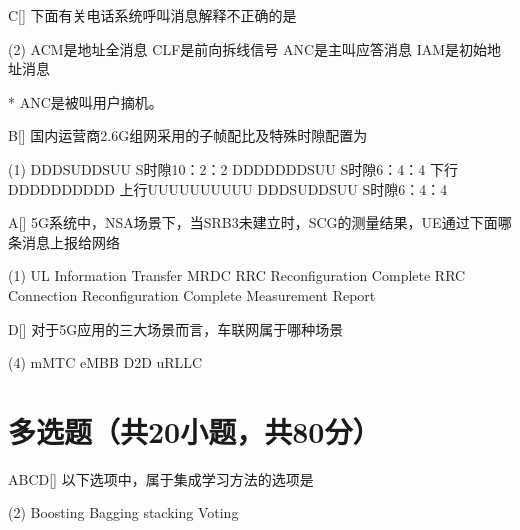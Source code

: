 \begin{choice}{C}[]
    下面有关电话系统呼叫消息解释不正确的是
    \begin{tasks}(2)
        \task ACM是地址全消息
        \task CLF是前向拆线信号
        \task ANC是主叫应答消息
        \task IAM是初始地址消息
    \end{tasks}
\end{choice}

\begin{solution}*
   ANC是被叫用户摘机。

\end{solution}

\begin{choice}{B}[]
    国内运营商2.6G组网采用的子帧配比及特殊时隙配置为
    \begin{tasks}(1)
        \task DDDSUDDSUU S时隙10：2：2
        \task DDDDDDDSUU S时隙6：4：4
        \task 下行DDDDDDDDDD 上行UUUUUUUUUU
        \task DDDSUDDSUU S时隙6：4：4
    \end{tasks}
\end{choice}


\begin{choice}{A}[]
    5G系统中，NSA场景下，当SRB3未建立时，SCG的测量结果，UE通过下面哪条消息上报给网络
    \begin{tasks}(1)
        \task UL Information Transfer MRDC
        \task  RRC Reconfiguration Complete
        \task RRC Connection Reconfiguration Complete
        \task Measurement Report
    \end{tasks}
\end{choice}


\begin{choice}{D}[]
    对于5G应用的三大场景而言，车联网属于哪种场景
    \begin{tasks}(4)
        \task mMTC
        \task eMBB
        \task D2D
        \task uRLLC
    \end{tasks}
\end{choice}

\section{多选题（共20小题，共80分）}

\begin{choice}{\;ABCD\;}[]
    以下选项中，属于集成学习方法的选项是
    \begin{tasks}(2)
        \task Boosting
        \task Bagging
        \task stacking
        \task Voting
    \end{tasks}
\end{choice}

